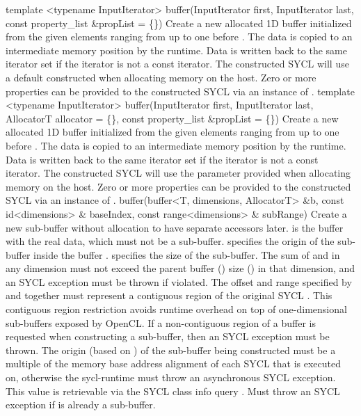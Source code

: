   \addRowThreeSL
    { template <typename InputIterator> }
    { buffer(InputIterator first, InputIterator last, }
    { const property_list \&propList = \{\}) }
    {
      Create a new allocated 1D buffer initialized from the given elements
      ranging from  up to one before .
      The data is copied to an intermediate memory position by the runtime.
      Data is written back to the same iterator set if the iterator is not
      a const iterator.
      The constructed SYCL  will use a default constructed  when allocating memory on the host.
      Zero or more properties can be provided to the constructed SYCL  via an instance of .
    }
  \addRowFourSL
    { template <typename InputIterator> }
    { buffer(InputIterator first, InputIterator last, }
    { AllocatorT allocator = \{\}, }
    { const property_list \&propList = \{\}) }
    {
      Create a new allocated 1D buffer initialized from the given elements
      ranging from  up to one before .
      The data is copied to an intermediate memory position by the runtime.
      Data is written back to the same iterator set if the iterator is not
      a const iterator.
      The constructed SYCL  will use the  parameter provided when allocating memory on the host.
      Zero or more properties can be provided to the constructed SYCL  via an instance of .
    }
  \addRowThreeSL
    { buffer(buffer<T, dimensions, AllocatorT> \&b, }
    { const id<dimensions> \& baseIndex, }
    { const range<dimensions> \& subRange) }
    {
      Create a new sub-buffer without allocation to have separate
      accessors later.  is the buffer with the real data, which must not be a sub-buffer.
       specifies the origin of the sub-buffer inside the
      buffer .  specifies the size of the sub-buffer.
      The sum of  and  in any dimension must not
      exceed the parent buffer () size () in that dimension,
      and an  SYCL exception must be thrown if violated.
      The offset and range specified by  and  together must represent a contiguous region of the original SYCL .  This contiguous region restriction avoids runtime overhead on top of one-dimensional sub-buffers exposed by OpenCL.  If a non-contiguous region of a buffer is requested when constructing a sub-buffer, then an  SYCL exception must be thrown.
      The origin (based on ) of the sub-buffer being constructed must be a multiple of the memory base address alignment of each SYCL  that is executed on, otherwise the \gls{sycl-runtime} must throw an asynchronous  SYCL exception.
      This value is retrievable via the SYCL  class info query .
      Must throw an  SYCL exception if  is already a sub-buffer.
    }
